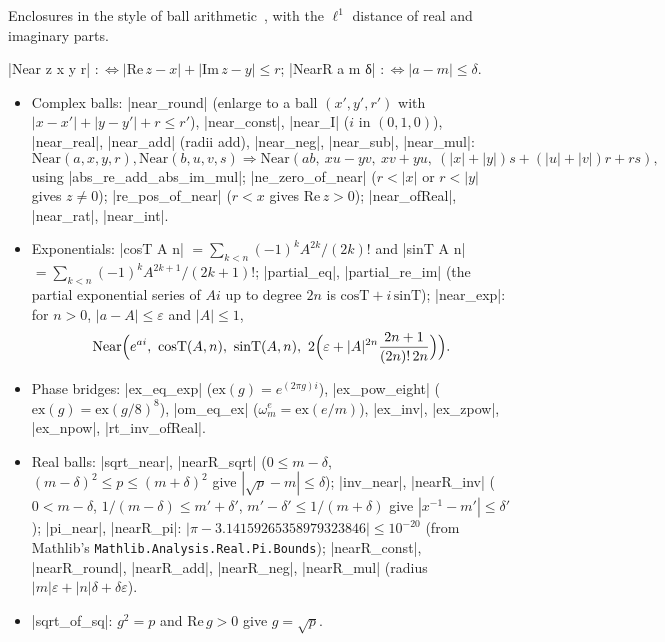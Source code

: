 Enclosures in the style of ball arithmetic~\cite{vanderhoeven2009ball}, with the $\ell^1$ distance
of real and imaginary parts.
\begin{definition}
\lean|Near z x y r| $:\iff|\mathrm{Re}\,z-x|+|\mathrm{Im}\,z-y|\le r$; \leanLLone|NearR a m δ| $:\iff|a-m|\le\delta$.
\end{definition}
\begin{itemize}
\item Complex balls: \lean|near_round| (enlarge to a ball $(x',y',r')$ with
  $|x-x'|+|y-y'|+r\le r'$), \lean|near_const|, \lean|near_I| ($i$ in $(0,1,0)$), \lean|near_real|,
  \lean|near_add| (radii add), \lean|near_neg|, \lean|near_sub|, \lean|near_mul|:
  \[\mathrm{Near}(a,x,y,r),\mathrm{Near}(b,u,v,s)\Rightarrow
  \mathrm{Near}(ab,\ xu-yv,\ xv+yu,\ (|x|+|y|)s+(|u|+|v|)r+rs),\]
  using \lean|abs_re_add_abs_im_mul|; \lean|ne_zero_of_near| ($r<|x|$ or $r<|y|$ gives $z\ne0$);
  \lean|re_pos_of_near| ($r<x$ gives $\mathrm{Re}\,z>0$); \lean|near_ofReal|, \lean|near_rat|,
  \lean|near_int|.
\item Exponentials: \lean|cosT A n| $=\sum_{k<n}(-1)^kA^{2k}/(2k)!$ and
  \lean|sinT A n| $=\sum_{k<n}(-1)^kA^{2k+1}/(2k+1)!$; \lean|partial_eq|, \lean|partial_re_im| (the
  partial exponential series of $Ai$ up to degree $2n$ is $\mathrm{cosT}+i\,\mathrm{sinT}$);
  \lean|near_exp|: for $n>0$, $|a-A|\le\varepsilon$ and $|A|\le1$,
  \[\mathrm{Near}\Bigl(e^{ai},\ \mathrm{cosT}(A,n),\ \mathrm{sinT}(A,n),\
  2\Bigl(\varepsilon+|A|^{2n}\frac{2n+1}{(2n)!\,2n}\Bigr)\Bigr).\]
\item Phase bridges: \lean|ex_eq_exp| ($\mathrm{ex}(g)=e^{(2\pi g)i}$), \lean|ex_pow_eight|
  ($\mathrm{ex}(g)=\mathrm{ex}(g/8)^8$), \lean|om_eq_ex| ($\omega_m^e=\mathrm{ex}(e/m)$), \lean|ex_inv|,
  \lean|ex_zpow|, \lean|ex_npow|, \lean|rt_inv_ofReal|.
\item Real balls: \lean|sqrt_near|, \lean|nearR_sqrt| ($0\le m-\delta$, $(m-\delta)^2\le p\le(m+\delta)^2$
  give $|\sqrt p-m|\le\delta$); \lean|inv_near|, \lean|nearR_inv| ($0<m-\delta$, $1/(m-\delta)\le m'+\delta'$,
  $m'-\delta'\le1/(m+\delta)$ give $|x^{-1}-m'|\le\delta'$); \lean|pi_near|, \lean|nearR_pi|:
  $|\pi-3.14159265358979323846|\le10^{-20}$ (from Mathlib's \nolinkurl{Mathlib.Analysis.Real.Pi.Bounds});
  \lean|nearR_const|, \lean|nearR_round|, \lean|nearR_add|, \lean|nearR_neg|, \lean|nearR_mul|
  (radius $|m|\varepsilon+|n|\delta+\delta\varepsilon$).
\item \lean|sqrt_of_sq|: $g^2=p$ and $\mathrm{Re}\,g>0$ give $g=\sqrt p$.
\end{itemize}

